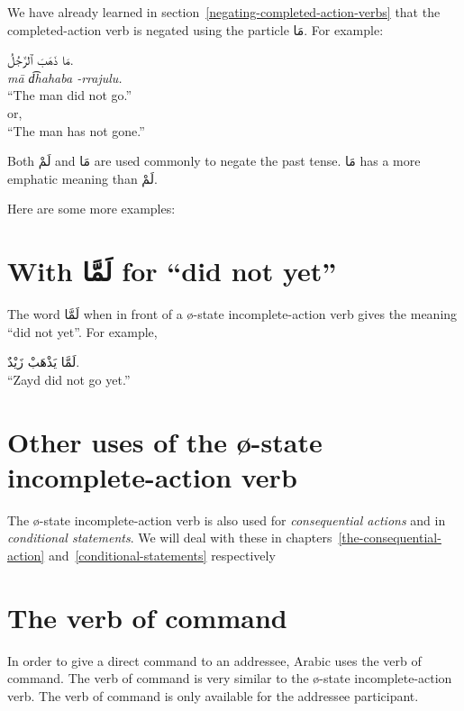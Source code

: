 \documentclass[
  10pt,
]{book}
\begin{document}
We have already learned in
section~\ref{negating-completed-action-verbs} that the completed-action verb is negated using the particle \foreignlanguage{arabic}{مَا}. For example:

\foreignlanguage{arabic}{مَا ذَهَبَ ٱلرَّجُلُ.}\\
\emph{mā d͡hahaba -rrajulu.}\\
\enquote{The man did not go.}\\
or,\\
\enquote{The man has not gone.}

Both \foreignlanguage{arabic}{لَمْ} and \foreignlanguage{arabic}{مَا} are used commonly to negate the past tense.
\foreignlanguage{arabic}{مَا} has a more emphatic meaning than \foreignlanguage{arabic}{لَمْ}.

Here are some more examples:

\section{\texorpdfstring{With \foreignlanguage{arabic}{لَمَّا} for \enquote{did not yet}}{With لَمَّا for ``did not yet''}}\label{with-ux644ux645ux627-for-did-not-yet}

The word \foreignlanguage{arabic}{لَمَّا} when in front of a
ø-state
incomplete-action verb
gives the meaning \enquote{did not yet}.
For example,

\foreignlanguage{arabic}{لَمَّا يَذْهَبْ زَيْدٌ.}\\
\enquote{Zayd did not go yet.}

\section{Other uses of the ø-state incomplete-action verb}\label{other-uses-of-the-0-state-incomplete-action-verb}

The ø-state incomplete-action verb is also used for \emph{consequential actions} and in \emph{conditional statements}. We will deal with these in
chapters~\ref{the-consequential-action}
and~\ref{conditional-statements}
respectively

\section{The verb of command}\label{verb-of-command}

In order to give a direct command to an addressee, Arabic uses the verb of command. The verb of command is very similar to the
ø-state
incomplete-action verb.
The verb of command is only available for the addressee participant.
\end{document}
